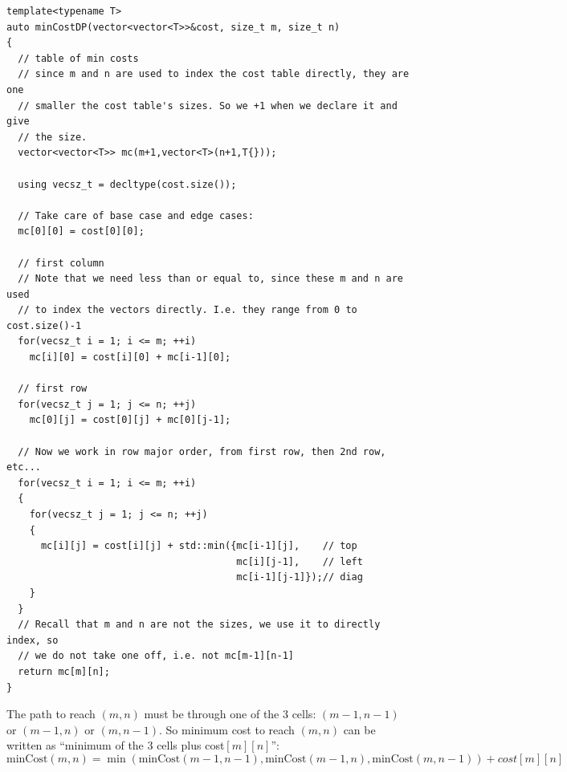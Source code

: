 \begin{lstlisting}[style=raycppnewsnippet]
template<typename T>
auto minCostDP(vector<vector<T>>&cost, size_t m, size_t n)
{
  // table of min costs
  // since m and n are used to index the cost table directly, they are one
  // smaller the cost table's sizes. So we +1 when we declare it and give 
  // the size.
  vector<vector<T>> mc(m+1,vector<T>(n+1,T{}));

  using vecsz_t = decltype(cost.size());

  // Take care of base case and edge cases:
  mc[0][0] = cost[0][0];

  // first column
  // Note that we need less than or equal to, since these m and n are used
  // to index the vectors directly. I.e. they range from 0 to cost.size()-1
  for(vecsz_t i = 1; i <= m; ++i)
    mc[i][0] = cost[i][0] + mc[i-1][0];
  
  // first row
  for(vecsz_t j = 1; j <= n; ++j)
    mc[0][j] = cost[0][j] + mc[0][j-1];

  // Now we work in row major order, from first row, then 2nd row, etc...
  for(vecsz_t i = 1; i <= m; ++i)
  {
    for(vecsz_t j = 1; j <= n; ++j)
    {
      mc[i][j] = cost[i][j] + std::min({mc[i-1][j],    // top
                                        mc[i][j-1],    // left
                                        mc[i-1][j-1]});// diag
    }
  }
  // Recall that m and n are not the sizes, we use it to directly index, so 
  // we do not take one off, i.e. not mc[m-1][n-1]
  return mc[m][n];
}
\end{lstlisting}

\RayNotesEnd

\textbf{}

The path to reach $(m,n)$ must be through one of the 3 cells: $(m-1,n-1)$ or
$(m-1,n)$ or $(m,n-1)$. So minimum cost to reach $(m,n)$ can be written as
``minimum of the 3 cells plus cost$[m][n]$'':
\begin{equation*}
\text{minCost}(m, n)
=\min(\text{minCost}(m-1,n-1),
      \text{minCost}(m-1, n),
      \text{minCost}(m,n-1))
      +cost[m][n]
\end{equation*}

